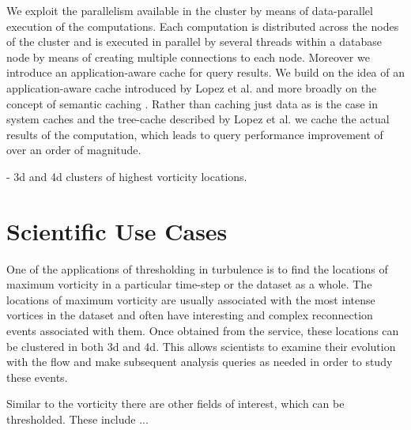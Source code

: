 \documentclass{sig-alternate}
\begin{document}
We exploit the parallelism 
available in the cluster by means of data-parallel execution of the computations. Each computation is distributed across the nodes of the cluster and
is executed in parallel by several threads within a database node by means of creating multiple connections to each node. Moreover we introduce an 
application-aware cache for query results. We build on the idea of an application-aware cache introduced by Lopez et al. \cite{Lopez} and more broadly 
on the concept of semantic caching \cite{Ren}. Rather than caching just data as is the case in system caches and the tree-cache described by Lopez et al.
we cache the actual results of the computation, which leads to query performance improvement of over an order of magnitude.

- 3d and 4d clusters of highest vorticity locations. 


\section{Scientific Use Cases}\label{science_use_cases}
One of the applications of thresholding in turbulence is to find the locations of maximum vorticity in a particular time-step or the dataset as a whole.
The locations of maximum vorticity are usually associated with the most intense vortices in the dataset and often have interesting and complex
reconnection events associated with them. 
Once obtained from the service, these locations can be clustered in both 3d and 4d. This allows scientists to examine their evolution with the flow
and make subsequent analysis queries as needed in order to study these events.

Similar to the vorticity there are other fields of interest, which can be thresholded. These include ...
\end{document}
